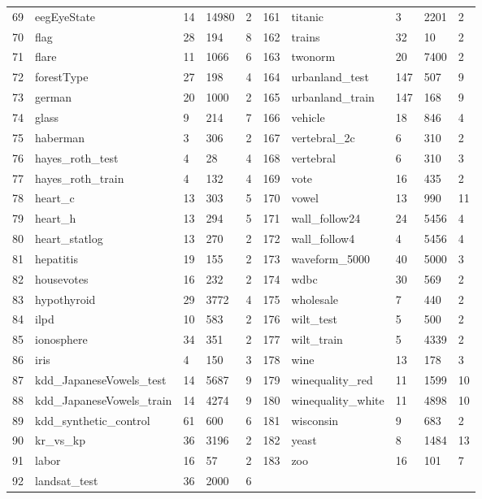 \documentclass[review,3p]{elsarticle}
\begin{document}
\begin{longtable}{p{0.1cm}lp{0.8cm}<{\centering}p{0.8cm}<{\centering}p{0.9cm}<{\centering}|p{0.1cm}lp{0.8cm}<{\centering}p{0.8cm}<{\centering}p{0.9cm}<{\centering}}
			69	&	eegEyeState	&	14	&	14980	&	2	&	161	&	titanic	&	3	&	2201	&	2	\\
			70	&	flag	&	28	&	194	&	8	&	162	&	trains	&	32	&	10	&	2	\\
			71	&	flare	&	11	&	1066	&	6	&	163	&	twonorm	&	20	&	7400	&	2	\\
			72	&	forestType	&	27	&	198	&	4	&	164	&	urbanland\_test	&	147	&	507	&	9	\\
			73	&	german	&	20	&	1000	&	2	&	165	&	urbanland\_train	&	147	&	168	&	9	\\
			74	&	glass	&	9	&	214	&	7	&	166	&	vehicle	&	18	&	846	&	4	\\
			75	&	haberman	&	3	&	306	&	2	&	167	&	vertebral\_2c	&	6	&	310	&	2	\\
			76	&	hayes\_roth\_test	&	4	&	28	&	4	&	168	&	vertebral	&	6	&	310	&	3	\\
			77	&	hayes\_roth\_train	&	4	&	132	&	4	&	169	&	vote	&	16	&	435	&	2	\\
			78	&	heart\_c	&	13	&	303	&	5	&	170	&	vowel	&	13	&	990	&	11	\\
			79	&	heart\_h	&	13	&	294	&	5	&	171	&	wall\_follow24	&	24	&	5456	&	4	\\
			80	&	heart\_statlog	&	13	&	270	&	2	&	172	&	wall\_follow4	&	4	&	5456	&	4	\\
			81	&	hepatitis	&	19	&	155	&	2	&	173	&	waveform\_5000	&	40	&	5000	&	3	\\
			82	&	housevotes	&	16	&	232	&	2	&	174	&	wdbc	&	30	&	569	&	2	\\
			83	&	hypothyroid	&	29	&	3772	&	4	&	175	&	wholesale	&	7	&	440	&	2	\\
			84	&	ilpd	&	10	&	583	&	2	&	176	&	wilt\_test	&	5	&	500	&	2	\\
			85	&	ionosphere	&	34	&	351	&	2	&	177	&	wilt\_train	&	5	&	4339	&	2	\\
			86	&	iris	&	4	&	150	&	3	&	178	&	wine	&	13	&	178	&	3	\\
			87	&	kdd\_JapaneseVowels\_test	&	14	&	5687	&	9	&	179	&	winequality\_red	&	11	&	1599	&	10	\\
			88	&	kdd\_JapaneseVowels\_train	&	14	&	4274	&	9	&	180	&	winequality\_white	&	11	&	4898	&	10	\\
			89	&	kdd\_synthetic\_control	&	61	&	600	&	6	&	181	&	wisconsin	&	9	&	683	&	2	\\
			90	&	kr\_vs\_kp	&	36	&	3196	&	2	&	182	&	yeast	&	8	&	1484	&	13	\\
			91	&	labor	&	16	&	57	&	2	&	183	&	zoo	&	16	&	101	&	7	\\
			92	&	landsat\_test	&	36	&	2000	&	6	&		&		&		&		&		\\ \hline
		\end{longtable}		
\end{document}
